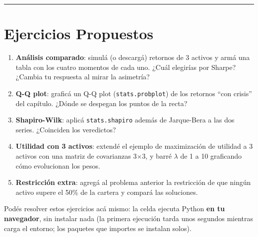 \documentclass[
  spanish,
  letterpaper,
  DIV=11,
  numbers=noendperiod]{scrreprt}
\providecommand{\tightlist}{%
  \setlength{\itemsep}{0pt}\setlength{\parskip}{0pt}}
\begin{document}
\begin{center}\rule{0.5\linewidth}{0.5pt}\end{center}

\chapter{Ejercicios Propuestos}\label{ejercicios-propuestos-6}

\begin{tcolorbox}[enhanced jigsaw, bottomrule=.15mm, colback=white, opacitybacktitle=0.6, arc=.35mm, toprule=.15mm, opacityback=0, breakable, titlerule=0mm, left=2mm, coltitle=black, colbacktitle=quarto-callout-important-color!10!white, colframe=quarto-callout-important-color-frame, leftrule=.75mm, toptitle=1mm, bottomtitle=1mm, title=\textcolor{quarto-callout-important-color}{\faExclamation}\hspace{0.5em}{Ejercicios}, rightrule=.15mm]

\begin{enumerate}
\def\labelenumi{\arabic{enumi}.}
\tightlist
\item
  \textbf{Análisis comparado}: simulá (o descargá) retornos de 3 activos
  y armá una tabla con los cuatro momentos de cada uno. ¿Cuál elegirías
  por Sharpe? ¿Cambia tu respuesta al mirar la asimetría?
\item
  \textbf{Q-Q plot}: graficá un Q-Q plot (\texttt{stats.probplot}) de
  los retornos ``con crisis'' del capítulo. ¿Dónde se despegan los
  puntos de la recta?
\item
  \textbf{Shapiro-Wilk}: aplicá \texttt{stats.shapiro} además de
  Jarque-Bera a las dos series. ¿Coinciden los veredictos?
\item
  \textbf{Utilidad con 3 activos}: extendé el ejemplo de maximización de
  utilidad a 3 activos con una matriz de covarianzas 3×3, y barré
  \(\lambda\) de 1 a 10 graficando cómo evolucionan los pesos.
\item
  \textbf{Restricción extra}: agregá al problema anterior la restricción
  de que ningún activo supere el 50\% de la cartera y compará las
  soluciones.
\end{enumerate}

\end{tcolorbox}

Podés resolver estos ejercicios acá mismo: la celda ejecuta Python
\textbf{en tu navegador}, sin instalar nada (la primera ejecución tarda
unos segundos mientras carga el entorno; los paquetes que importes se
instalan solos).
\end{document}
